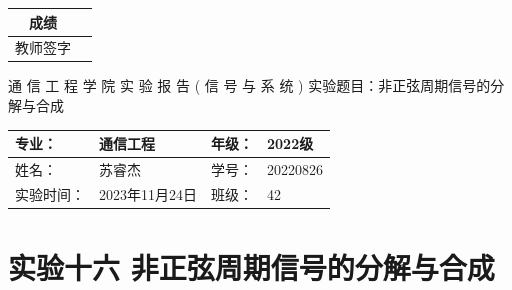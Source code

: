 \documentclass[dvipsnames, svgnames,a4paper,11pt]{article}
\begin{document}
\begin{table}
  \raggedleft
	\renewcommand\arraystretch{1.7}
	\begin{tabular}{|c|p{4em}|}
	\hline
	成绩 &  \\
	\hline
	教师签字 &   \\
	\hline
	\end{tabular}
\end{table}

\begin{center}
	{\kaishu \LARGE   \quad  \quad 通  \quad 信  \quad 工  \quad 程  \quad 学  \quad 院 }
  \newline
  \newline
  \newline
  \newline
  \newline
  {\kaishu \Huge 实 \quad  \quad  \quad 验  \quad  \quad  \quad 报 \quad  \quad  \quad 告}
  \newline
  \newline
  \newline
  \newline
  \newline
  {\songti \Huge  ( \quad  信  \quad 号  \quad 与  \quad 系  \quad 统 \quad)}
  \newline
  \newline
  \newline
  \newline
  \newline
  {\songti  \LARGE 实验题目：非正弦周期信号的分解与合成  \quad  \quad \quad}
\end{center}



\begin{table}[b]
	\renewcommand\arraystretch{1.7}
	\begin{tabularx}{\textwidth}{|X|X|X|X|}
	\hline
	专业：& 通信工程 &年级：& 2022级\\
	\hline
	姓名：& 苏睿杰  & 学号：& 20220826\\
	\hline
	实验时间：& 2023年11月24日 & 班级：& 42 \\
	\hline
	\end{tabularx}
\end{table}



\clearpage
\setcounter{section}{0}
\section{实验十六 \quad 非正弦周期信号的分解与合成}
\end{document}
